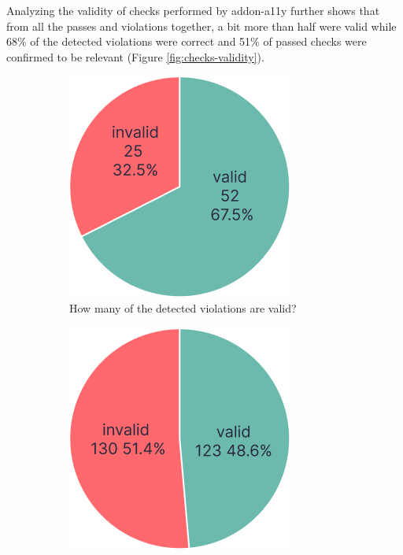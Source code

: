 \documentclass{master_thesis}
\begin{document}
Analyzing the validity of checks performed by addon-a11y further shows that from all the passes and violations together, a bit more than half were valid while 68\% of the detected violations were correct and 51\% of passed checks were confirmed to be relevant (Figure \ref{fig:checks-validity}).

\begin{figure}[ht]
	\centering
	\begin{subfigure}{0.3\textwidth}
	\includegraphics[width=\textwidth]{img/violations.png}
	\caption{How many of the detected violations are valid?}
	\label{fig:checks-validity-failed}
	\end{subfigure}
	\hspace{0.03\textwidth}
	\begin{subfigure}{0.3\textwidth}
	\includegraphics[width=\textwidth]{img/passes.png}

\end{subfigure}
\end{figure}
\end{document}
